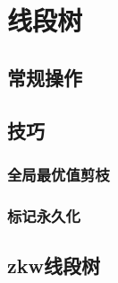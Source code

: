 \section{线段树}
\subsection{常规操作}
\subsection{技巧}
\subsubsection{全局最优值剪枝}
\subsubsection{标记永久化}
\subsection{zkw线段树}
